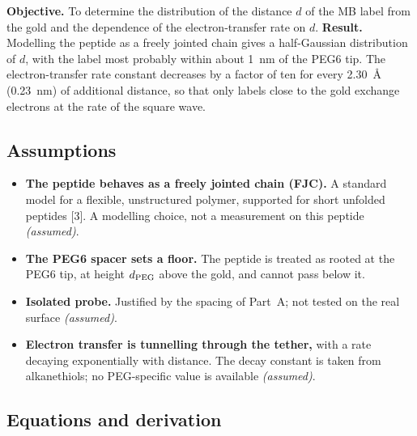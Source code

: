 \documentclass[10pt,a4paper]{article}
\numberwithin{equation}{section}
\newcommand{\cit}[1]{[#1]}
\newcommand{\FLAG}{\textit{(assumed)}}
\newenvironment{assump}{\small}{\smallskip}
\newcommand{\kOrder}{2.30}
\begin{document}
\textbf{Objective.} To determine the distribution of the distance $d$ of the MB label from
the gold and the dependence of the electron-transfer rate on $d$. \textbf{Result.} Modelling the
peptide as a freely jointed chain gives a half-Gaussian distribution of $d$, with the
label most probably within about 1~nm of the PEG6 tip. The electron-transfer rate constant
decreases by a factor of ten for every \kOrder~\AA{} (0.23~nm) of additional distance, so that
only labels close to the gold exchange electrons at the rate of the square wave.

\subsection{Assumptions}

\begin{assump}
\begin{itemize}[leftmargin=*]
\item \textbf{The peptide behaves as a freely jointed chain (FJC).} A standard
  model for a flexible, unstructured polymer, supported for short unfolded
  peptides \cit{3}. A modelling choice, not a measurement on this peptide \FLAG.
\item \textbf{The PEG6 spacer sets a floor.} The peptide is treated as rooted at the
  PEG6 tip, at height $d_{\rm PEG}$ above the gold, and cannot pass below it.
\item \textbf{Isolated probe.} Justified by the spacing of Part~A; not tested on the
  real surface \FLAG.
\item \textbf{Electron transfer is tunnelling through the tether,} with a rate
  decaying exponentially with distance. The decay constant is taken from alkanethiols;
  no PEG-specific value is available \FLAG.
\end{itemize}
\end{assump}

\subsection{Equations and derivation}
\end{document}
